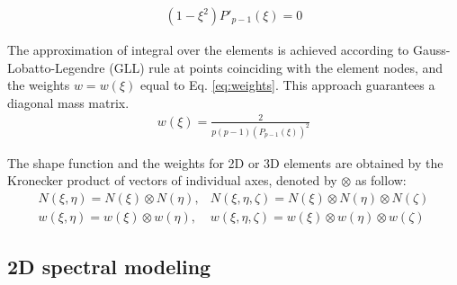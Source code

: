 \documentclass[materials,article,submit,moreauthors,pdftex]{Definitions/mdpi}
\begin{document}
{\begin{eqnarray}
(1-\xi^2)P'_{p-1}(\xi)=0
\label{eq:nodes}
\end{eqnarray}

The approximation of integral over the elements is achieved according to Gauss-Lobatto-Legendre (GLL) rule at points coinciding with the element nodes, 
and the weights \(w=w(\xi)\) equal to Eq. \ref{eq:weights}. This approach guarantees a diagonal mass matrix.
\begin{eqnarray}
{w(\xi)} = \frac{2}{p(p-1)(P_{p-1}(\xi))^2}
\label{eq:weights}
\end{eqnarray}

The shape function and the weights for 2D or 3D elements are obtained by the Kronecker product of vectors of individual axes, denoted by \(\otimes\) as follow:
\begin{eqnarray}
N(\xi,\eta) = N(\xi)\otimes N(\eta), & N(\xi,\eta,\zeta) = N(\xi)\otimes N(\eta)\otimes N(\zeta) \nonumber\\
w(\xi,\eta) = w(\xi)\otimes w(\eta), & w(\xi,\eta,\zeta) = w(\xi)\otimes w(\eta)\otimes w(\zeta) 
\label{eq:3Dshape_weights}
\end{eqnarray}
\subsection{2D spectral modeling}
\label{sec:2D_SEM}

}
\end{document}
